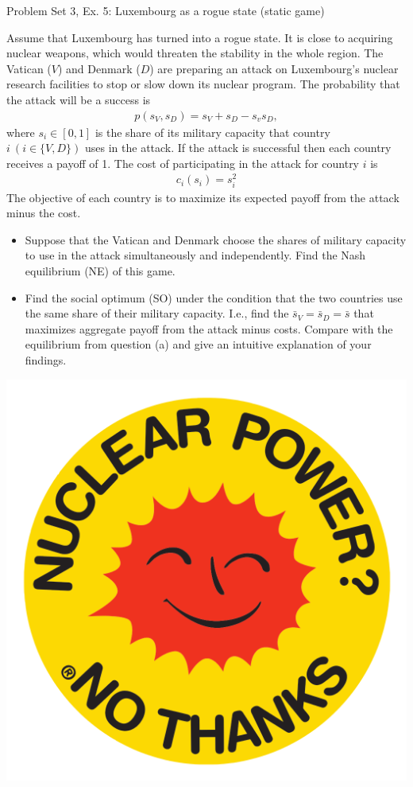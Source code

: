 \begin{frame}{Problem Set 3, Ex. 5: Luxembourg as a rogue state (static game)}
  \begin{multicols}{2}
    Assume that Luxembourg has turned into a rogue state. It is close to acquiring nuclear weapons, which would threaten the stability in the whole region. The Vatican ($V$) and Denmark ($D$) are preparing an attack on Luxembourg’s nuclear research facilities to stop or slow down its nuclear program. The probability that the attack will be a success is
    \begin{align*}
      p(s_V,s_D)=s_V+s_D-s_vs_D,
    \end{align*}
    where $s_i\in[0,1]$ is the share of its military capacity that country $i\ (i\in\{V,D\})$ uses in the attack. If the attack is successful then each country receives a payoff of 1. The cost of participating in the attack for country $i$ is
    \begin{align*}
      c_i(s_i)=s_i^2
    \end{align*}
    The objective of each country is to maximize its expected payoff from the attack minus the cost.
  \vfill\null\columnbreak
    \begin{itemize}
      \item[(a)] Suppose that the Vatican and Denmark choose the shares of military capacity to use in the attack simultaneously and independently. Find the Nash equilibrium (NE) of this game.
      \item[(b)] Find the social optimum (SO) under the condition that the two countries use the same share of their military capacity. I.e., find the $\bar{s}_V=\bar{s}_D=\bar{s}$ that maximizes aggregate payoff from the attack minus costs. Compare with the equilibrium from question (a) and give an intuitive explanation of your findings.
    \end{itemize}
    \hfill \includegraphics[width=0.20 \textwidth]{figures/nuclear}
  \vfill\null
  \end{multicols}
\end{frame}

